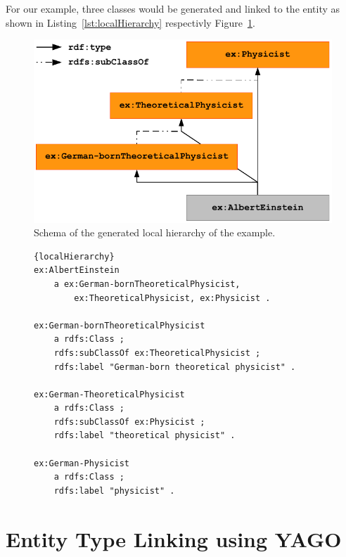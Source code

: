For our example, three classes would be generated and linked to the entity as shown in Listing~\ref{lst:localHierarchy} respectivly Figure~\ref{fig:localHierarchy}.%

\begin{figure}[htb!]
\centering
\includegraphics[scale=0.75]{part_02/unstructured_annotation/fig/localHierarchy.pdf}
\caption{Schema of the generated local hierarchy of the example.}
\label{fig:localHierarchy}
\end{figure}

\begin{figure}[htb!]
\begin{lstlisting}[label=lst:localHierarchy,caption=The local hierarchy is generated from the extracted string expressed using Turtle as \ac{RDF} serialization.]{localHierarchy}
ex:AlbertEinstein
    a ex:German-bornTheoreticalPhysicist, 
        ex:TheoreticalPhysicist, ex:Physicist .

ex:German-bornTheoreticalPhysicist
    a rdfs:Class ;
    rdfs:subClassOf ex:TheoreticalPhysicist ;
    rdfs:label "German-born theoretical physicist" .

ex:German-TheoreticalPhysicist
    a rdfs:Class ;
    rdfs:subClassOf ex:Physicist ;
    rdfs:label "theoretical physicist" .

ex:German-Physicist
    a rdfs:Class ;
    rdfs:label "physicist" .

\end{lstlisting}
\end{figure}

\section{Entity Type Linking using YAGO}
\label{sec:linkingyago}

